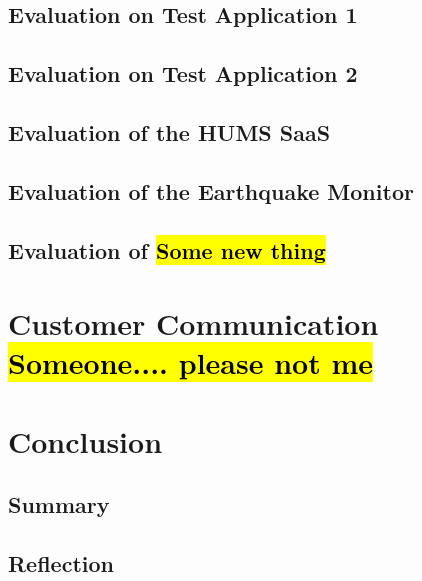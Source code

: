 \documentclass[10pt,a4paper]{article}
\begin{document}
\subsection{Evaluation on Test Application 1}
\label{sec:test_app1}


\subsection{Evaluation on Test Application 2}
\label{sec:test_app2}


\subsection{Evaluation of the HUMS SaaS}
\label{sec:hums_saas}


\subsection{Evaluation of the Earthquake Monitor}
\label{sec:earthquake}


\subsection{Evaluation of \hl{Some new thing}}
\label{sec:new_thing} %


\section{Customer Communication \hl{Someone.... please not me}}
\label{sec:customer_comms}

\section{Conclusion}
\label{sec:conclusion}


\subsection{Summary}
\label{sec:summary}


\subsection{Reflection}
\label{sec:reflection}



\end{document}
